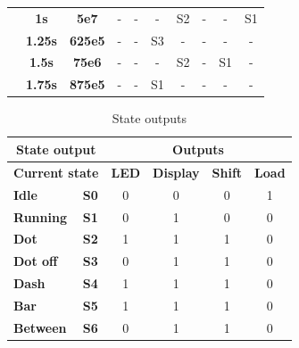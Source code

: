 \documentclass{article}
\begin{document}
\begin{table}[htbp]
{\begin{tabular}{|c|c|c|c|c|c|c|c|c|c|}
\cline{2-10}          & \textbf{1s} & \textbf{5e7} & -     & -     & -     & S2    & -     & -     & S1 \bigstrut\\
\cline{2-10}          & \textbf{1.25s} & \textbf{625e5} & -     & -     & S3    & -     & -     & -     & - \bigstrut\\
\cline{2-10}          & \textbf{1.5s} & \textbf{75e6} & -     & -     & -     & S2    & -     & S1    & - \bigstrut\\
\cline{2-10}          & \textbf{1.75s} & \textbf{875e5} & -     & -     & S1    & -     & -     & -     & - \bigstrut\\
    \hline
    \end{tabular}}%
  \label{tab:StateTransition}%
\end{table}%

\begin{table}[htbp]
  \centering
  \caption{State outputs}
    \begin{tabular}{|l|c|c|c|c|c|}
    \hline
    \multicolumn{2}{|c|}{\textbf{State output}} & \multicolumn{4}{c|}{\textbf{Outputs}} \bigstrut\\
    \hline
    \multicolumn{2}{|c|}{\textbf{Current state}} & \textbf{LED} & \textbf{Display} & \textbf{Shift} & \textbf{Load} \bigstrut\\
    \hline
    \textbf{Idle} & \textbf{S0} & 0     & 0     & 0     & 1 \bigstrut\\
    \hline
    \textbf{Running} & \textbf{S1} & 0     & 1     & 0     & 0 \bigstrut\\
    \hline
    \textbf{Dot} & \textbf{S2} & 1     & 1     & 1     & 0 \bigstrut\\
    \hline
    \textbf{Dot off} & \textbf{S3}    & 0     & 1     & 1     & 0 \bigstrut\\
    \hline
    \textbf{Dash} & \textbf{S4}    & 1     & 1     & 1     & 0 \bigstrut\\
    \hline
    \textbf{Bar} & \textbf{S5}    & 1     & 1     & 1     & 0 \bigstrut\\
    \hline
    \textbf{Between} & \textbf{S6}    & 0     & 1     & 1     & 0 \bigstrut\\
    \hline
    \end{tabular}%
  \label{tab:StateOutput}%
\end{table}%
\end{document}
